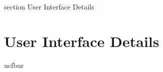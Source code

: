 

 {section} {User Interface Details}
\section*{User Interface Details}

ucfbur
\label{User Interface Details}
\clearpage